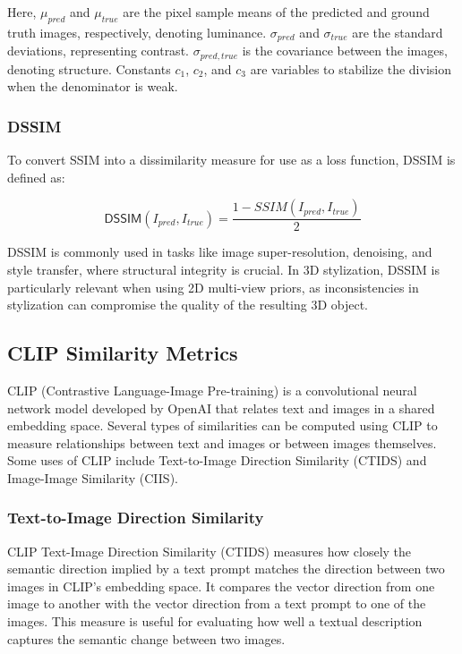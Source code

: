 Here, $\mu_{pred}$ and $\mu_{true}$ are the pixel sample means of the predicted and ground truth images, respectively, denoting luminance. $\sigma_{pred}$ and $\sigma_{true}$ are the standard deviations, representing contrast. $\sigma_{pred, true}$ is the covariance between the images, denoting structure. Constants $c_1$, $c_2$, and $c_3$ are variables to stabilize the division when the denominator is weak.

\subsubsection{DSSIM}
To convert SSIM into a dissimilarity measure for use as a loss function, DSSIM is defined as:

\begin{equation}
    \mathsf{DSSIM}(I_{pred}, I_{true}) = \frac{1-SSIM(I_{pred}, I_{true})}{2}
\end{equation}

DSSIM is commonly used in tasks like image super-resolution, denoising, and style transfer, where structural integrity is crucial. In 3D stylization, DSSIM is particularly relevant when using 2D multi-view priors, as inconsistencies in stylization can compromise the quality of the resulting 3D object.

\subsection{CLIP Similarity Metrics}
CLIP (Contrastive Language-Image Pre-training) \citep{Radford.2021} is a convolutional neural network model developed by OpenAI that relates text and images in a shared embedding space. Several types of similarities can be computed using CLIP to measure relationships between text and images or between images themselves. Some uses of CLIP include Text-to-Image Direction Similarity (CTIDS) and Image-Image Similarity (CIIS).

\subsubsection{Text-to-Image Direction Similarity}
CLIP Text-Image Direction Similarity (CTIDS) measures how closely the semantic direction implied by a text prompt matches the direction between two images in CLIP's embedding space. It compares the vector direction from one image to another with the vector direction from a text prompt to one of the images. This measure is useful for evaluating how well a textual description captures the semantic change between two images.

